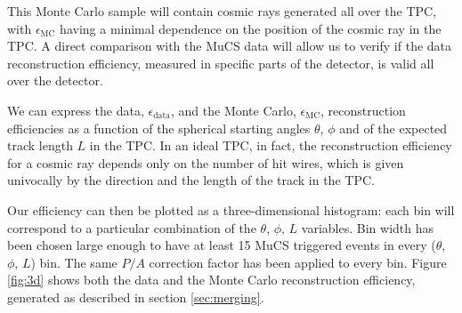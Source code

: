 \documentclass[a4paper]{scrartcl}
\begin{document}
This Monte Carlo sample will contain cosmic rays generated all over the TPC, with $\epsilon_{\mathrm{MC}}$ having a minimal dependence on the position of the cosmic ray in the TPC. A direct comparison with the MuCS data will allow us to verify if the data reconstruction efficiency, measured in specific parts of the detector, is valid all over the detector.

We can express the data, $\epsilon_{\mathrm{data}}$, and the Monte Carlo, $\epsilon_{\mathrm{MC}}$, reconstruction efficiencies as a function of the spherical starting angles $\theta$, $\phi$ and of the expected track length $L$ in the TPC. In an ideal TPC, in fact, the reconstruction efficiency for a cosmic ray depends only on the number of hit wires, which is given univocally by the direction and the length of the track in the TPC.

Our efficiency can then be plotted as a three-dimensional histogram: each bin will correspond to a particular combination of the $\theta$, $\phi$, $L$ variables. Bin width has been chosen large enough to have at least 15 MuCS triggered events in every ($\theta$, $\phi$, $L$) bin. The same $P/A$ correction factor has been applied to every bin. Figure \ref{fig:3d} shows both the data and the Monte Carlo reconstruction efficiency, generated as described in section \ref{sec:merging}.
\end{document}
